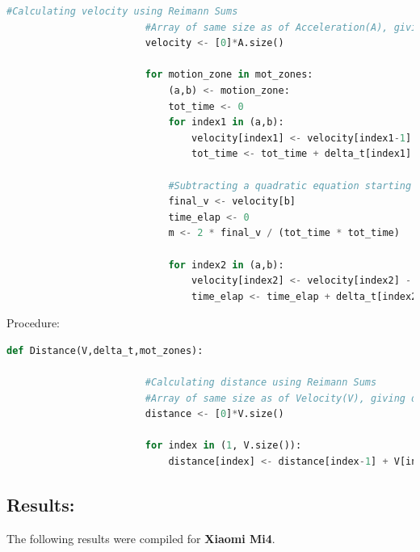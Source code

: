 \documentclass{article}
\begin{document}
\begin{itemize}
\begin{lstlisting}[language=Python, caption=Velocity()]
						#Calculating velocity using Reimann Sums
						#Array of same size as of Acceleration(A), giving velocity at that point 	
						velocity <- [0]*A.size()

						for motion_zone in mot_zones:
							(a,b) <- motion_zone:
							tot_time <- 0
							for index1 in (a,b):
								velocity[index1] <- velocity[index1-1] + A[index1] * delta_t[index1]
								tot_time <- tot_time + delta_t[index1]

							#Subtracting a quadratic equation starting and ending at the end points of a zone
							final_v <- velocity[b]
							time_elap <- 0
							m <- 2 * final_v / (tot_time * tot_time)

							for index2 in (a,b):
								velocity[index2] <- velocity[index2] - 0.5*m*time_elap*time_elap
								time_elap <- time_elap + delta_t[index2]
				\end{lstlisting}
				 Procedure:
				\begin{lstlisting}[language=Python, caption=Distance()]
					def Distance(V,delta_t,mot_zones):

						#Calculating distance using Reimann Sums
						#Array of same size as of Velocity(V), giving distance upto that point 	
						distance <- [0]*V.size()

						for index in (1, V.size()):
							distance[index] <- distance[index-1] + V[index] * delta_t[index]
				\end{lstlisting}
				\end{itemize}
		\subsection{Results:}
			The following results were compiled for \textbf{Xiaomi Mi4}.
\end{document}
